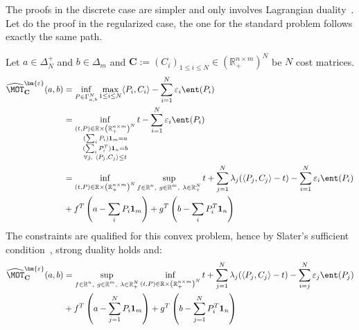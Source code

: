 \begin{prv*}
The proofs in the discrete case are simpler and only involves Lagrangian duality~\citep[Chapter 5]{boyd2004convex}. Let do the  proof in the regularized case, the one for the standard problem follows exactly the same path.

Let $a\in\Delta_N^{+}$ and $b\in\Delta_m$ and $\mathbf{C}:=(C_i)_{1\leq i\leq N}\in\left(\mathbb{R}_+^{n\times m}\right)^N$ be $N$ cost matrices. 
\begin{align*}
    \widehat{\MOT}^{\bm{\varepsilon}}_{\mathbf{C}}(a,b)&=\inf_{P\in \Gamma_{a,b}^N} \max_{1\leq i\leq N}\langle P_i,C_i\rangle -\sum_{i=1}^N\varepsilon_i \ent(P_i) \\
    &=\inf\limits_{\substack{(t,P)\in \mathbb{R}\times\left(\mathbb{R}_+^{n\times m}\right)^N\\(\sum_i P_i)\mathbf{1}_m=a\\
     (\sum_i P_i^T)\mathbf{1}_n=b\\
    \forall j,~\langle P_j,C_j\rangle \leq t}}t -\sum_{i=1}^N\varepsilon_i \ent(P_i)\\
    &=\inf\limits_{\substack{(t,P)\in \mathbb{R}\times\left(\mathbb{R}_+^{n\times m}\right)^N}}\sup\limits_{\substack{f\in\mathbb{R}^n,~g\in\mathbb{R}^m,~\lambda\in\mathbb{R}_+^N}} t+\sum_{j=1}^N\lambda_j(\langle P_j,C_j\rangle- t) -\sum_{i=1}^N\varepsilon_i \ent(P_i)\\
    &+f^T\left(a-\sum_i P_i\mathbf{1}_m\right)+g^T\left(b-\sum_i P_i^T\mathbf{1}_n\right)\\
\end{align*}
The constraints are qualified for this convex problem, hence by Slater's sufficient condition~\citep[Section 5.2.3]{boyd2004convex}, strong duality holds and:
\begin{align*}
    \widehat{\MOT}^{\bm{\varepsilon}}_{\mathbf{C}}(a,b)
    &=\sup\limits_{\substack{f\in\mathbb{R}^n,~g\in\mathbb{R}^m,~\lambda\in\mathbb{R}_+^N}}\inf\limits_{\substack{(t,P)\in \mathbb{R}\times\left(\mathbb{R}_+^{n\times m}\right)^N}} t+\sum_{j=1}^N\lambda_j(\langle P_j,C_j\rangle- t) -\sum_{i=j}^N\varepsilon_j \ent(P_j)\\
    &+f^T\left(a-\sum_{j=1}^N P_i\mathbf{1}_m\right)+g^T\left(b-\sum_{j=1}^N P_i^T\mathbf{1}_n\right)\\

\end{align*}
\end{prv*}
